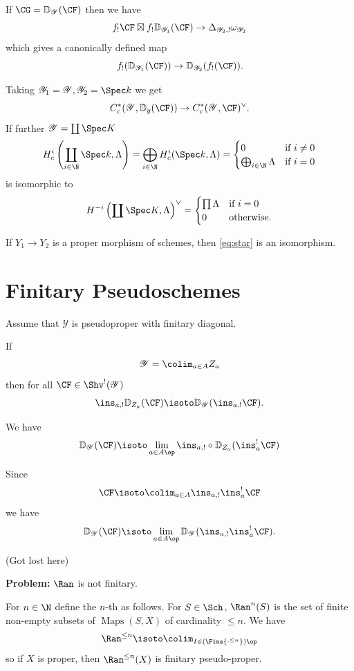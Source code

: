 \documentclass[oneside]{amsart}
\newcommand{\CY}{\mathcal{Y}}
\DeclareMathOperator{\Maps}{Maps}
\newcommand{\VD}{\mathbb{D}}
\begin{document}
If $\CG=\VD_\CY(\CF)$ then we have
\[
f_!\CF\boxtimes f_!\VD_{\CY_1}(\CF) \to \Delta_{\CY_2,!}\omega_{\CY_2}
\] 
which gives a canonically defined map
\begin{equation}\label{eq:star}
f_!(\VD_{\CY_1}(\CF)) \to \VD_{\CY_2}(f_!(\CF)).
\end{equation} 

Taking $\CY_1=\CY,\CY_2=\Spec k$ we get
\[
C_c^{*}(\CY,\VD_y(\CF)) \to C_c^{*}(\CY,\CF)^{\vee}.
\] 
If further $\CY = \coprod \Spec K$ 
\[
H_c^{i}\left( \coprod_{i \in \N}\Spec k,\Lambda \right) = \bigoplus_{i\in \N}H^{i}_c(\Spec k,\Lambda) = \begin{cases}
	0 & \text{if }i\neq 0 \\
	\bigoplus_{i\in \N}\Lambda & \text{if }i=0
\end{cases}
\] 
is isomorphic to
\[
H^{-i}\left( \coprod \Spec K,\Lambda \right) ^{\vee} = \begin{cases}
	\prod \Lambda & \text{if }i=0 \\
	0 & \text{otherwise}.
\end{cases}
\] 

\begin{lemma}
	If $Y_1\to Y_2$ is a proper morphism of schemes, then \eqref{eq:star} is an isomorphism.
\end{lemma}

\section{Finitary Pseudoschemes}
Assume that $\CY$ is pseudoproper with finitary diagonal.
\begin{proposition}
	If
	\[
	\CY = \colim_{a\in A}Z_a
	\] 
	then for all $\CF\in \Shv^{!}(\CY)$ 
	\[
	\ins_{a,!}\VD_{Z_a}(\CF) \isoto \VD_{\CY}(\ins_{a,!}\CF).
	\] 
\end{proposition}
\begin{corollary}
	We have
	\[
		\VD_{\CY}(\CF) \isoto \lim_{a\in A\op}\ins_{a,!}\circ\VD_{Z_a}(\ins_a^{!}\CF)
	\] 
\end{corollary}
Since
\[
\CF \isoto \colim_{a\in A}\ins_{a,!}\ins_a^{!}\CF
\] 
we have
\[
\VD_{\CY}(\CF) \isoto \lim_{a\in A\op}\VD_\CY(\ins_{a,!}\ins_a^{!}\CF).
\] 

(Got lost here)

\textbf{Problem:} $\Ran$ is not finitary.

For $n\in \N$ define the $n$-th  as follows. For $S\in \Sch$, $\Ran^{n}(S)$ is the set of finite non-empty subsets of $\Maps(S,X)$ of cardinality $\le n$. We have
\[
	\Ran^{\le n} \isoto \colim_{I\in (\Fins{^{,\le n}})\op}
\] 
so if $X$ is proper, then $\Ran^{\le n}(X)$ is finitary pseudo-proper.
\end{document}
